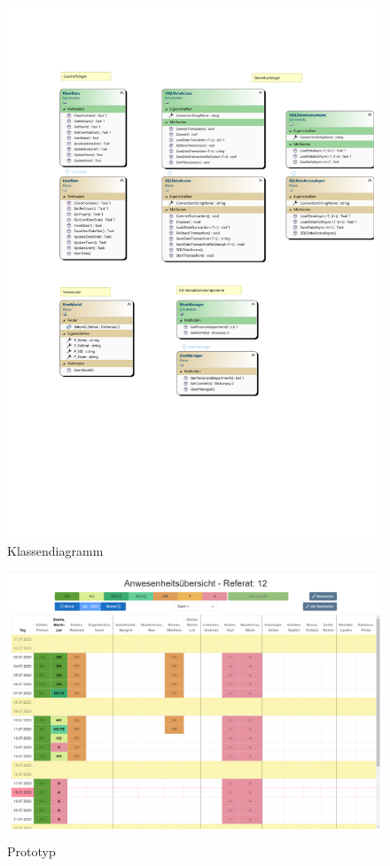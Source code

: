 \begin{figure}[htb]
    \centering
    \includegraphics[width=1\textwidth,angle=0]{anhang/abb/Klassendiagramm.pdf}
    \caption[Klassendiagramm]{Klassendiagramm}
    \label{abb:Klassendiagramm}
\end{figure}

\begin{figure}[htb]
    \centering
    \includegraphics[angle=90, page=1,height=0.90\textheight, keepaspectratio]{abb/Prototyp_GUI.png}
    \caption[Benutzeroberfläche des Prototyps]{Prototyp}
    \label{abb:Prototyp}
\end{figure}